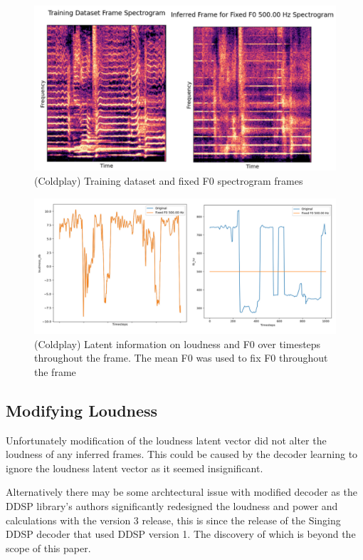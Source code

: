 \begin{figure}[H]
    \centering
    \includegraphics[width=\textwidth]{research/results/Coldplay/FixedF0.png}
    \caption{(Coldplay) Training dataset and fixed F0 spectrogram frames}
\end{figure}

\begin{figure}[H]
    \centering
    \includegraphics[width=\textwidth]{research/results/Coldplay/FixedF0Graphs.png}
    \caption{(Coldplay) Latent information on loudness and F0 over timesteps throughout the frame. The mean F0 was used to fix F0 throughout the frame}
\end{figure}

\subsection{Modifying Loudness}

Unfortunately modification of the loudness latent vector did not alter the loudness of any inferred frames. This could be caused by the decoder learning to ignore the loudness latent vector as it seemed insignificant.

Alternatively there may be some archtectural issue with modified decoder as the DDSP library's authors significantly redesigned the loudness and power and calculations with the version 3 release, this is since the release of the Singing DDSP decoder that used DDSP version 1. The discovery of which is beyond the scope of this paper.

